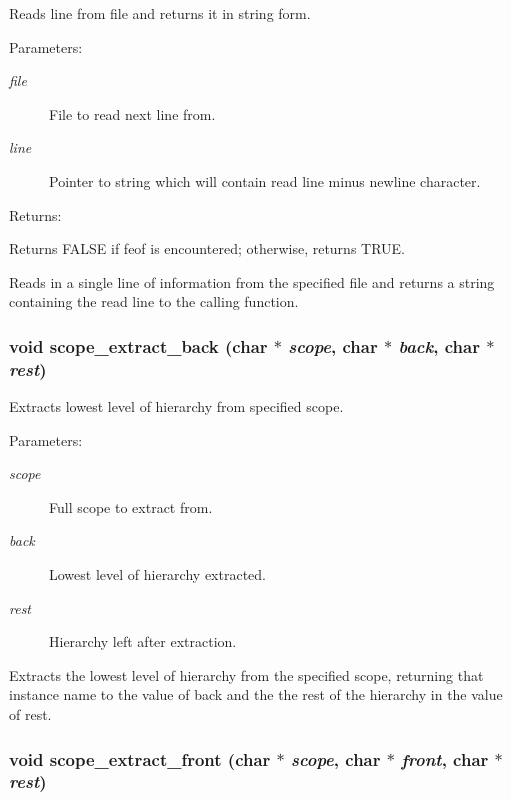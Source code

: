 Reads line from file and returns it in string form.

\begin{Desc}
\item[Parameters: ]\par
\begin{description}
\item[{\em 
file}]File to read next line from. \item[{\em 
line}]Pointer to string which will contain read line minus newline character.\end{description}
\end{Desc}
\begin{Desc}
\item[Returns: ]\par
Returns FALSE if feof is encountered; otherwise, returns TRUE.\end{Desc}
Reads in a single line of information from the specified file and returns a string containing the read line to the calling function. 
\subsubsection{\setlength{\rightskip}{0pt plus 5cm}void scope\_\-extract\_\-back (char $\ast$ {\em scope}, char $\ast$ {\em back}, char $\ast$ {\em rest})}\label{util_8h_a8}


Extracts lowest level of hierarchy from specified scope.

\begin{Desc}
\item[Parameters: ]\par
\begin{description}
\item[{\em 
scope}]Full scope to extract from. \item[{\em 
back}]Lowest level of hierarchy extracted. \item[{\em 
rest}]Hierarchy left after extraction.\end{description}
\end{Desc}
Extracts the lowest level of hierarchy from the specified scope, returning that instance name to the value of back and the the rest of the hierarchy in the value of rest. 
\subsubsection{\setlength{\rightskip}{0pt plus 5cm}void scope\_\-extract\_\-front (char $\ast$ {\em scope}, char $\ast$ {\em front}, char $\ast$ {\em rest})}\label{util_8h_a7}


